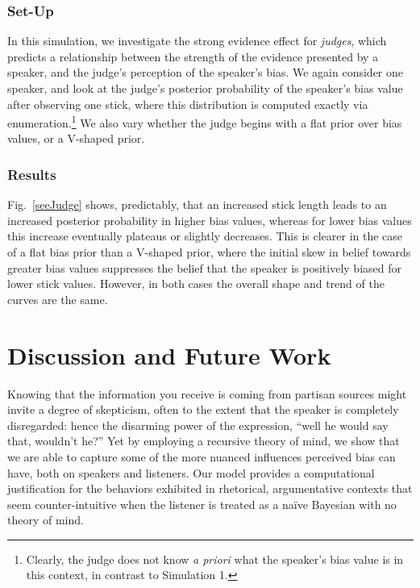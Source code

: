 \documentclass[10pt,letterpaper]{article}
\begin{document}
\subsubsection{Set-Up}
In this simulation, we investigate the strong evidence effect for \textit{judges}, which predicts a relationship between 
the strength of the evidence presented by a speaker, and the judge's perception of the speaker's bias.
We again consider one speaker, and look at the judge's posterior probability of the speaker's bias value after 
observing one stick, where this distribution is computed exactly via enumeration.\footnote{Clearly, the judge does 
not know \textit{a priori} what the speaker's bias value is in this context, in contrast to Simulation 1.} We also vary 
whether the judge begins with a flat prior over bias values, or a V-shaped prior.

\subsubsection{Results}

Fig.~\ref{seeJudge} shows, predictably, that an increased stick length leads to an increased posterior probability in
higher bias values, whereas for lower bias values this increase eventually plateaus or slightly decreases. This is clearer 
in the case of a flat bias prior than a V-shaped prior, where the initial skew in belief towards greater bias values suppresses
the belief that the speaker is positively biased for lower stick values. However, in both cases the overall shape and trend 
of the curves are the same.



\section{Discussion and Future Work}


Knowing that the information you receive is coming from partisan sources might invite a degree of skepticism, often to
the extent that the speaker is completely disregarded: hence the disarming power of the expression, 
``well he would say that, wouldn't he?''  Yet by employing a recursive theory of
mind, we show that we are able to capture some of the more nuanced influences perceived bias can have,
both on speakers and listeners. Our model provides a computational justification for the 
behaviors exhibited in rhetorical, argumentative contexts that seem counter-intuitive when the listener is
treated as a na\"ive Bayesian with no theory of mind.
\end{document}
